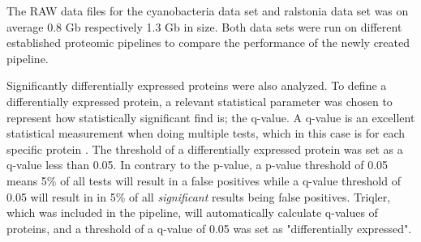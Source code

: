 The RAW data files for the cyanobacteria data set and ralstonia data set was on average 0.8 Gb respectively 1.3 Gb in size. Both data sets were run on different established proteomic pipelines to compare the performance of the newly created pipeline.

Significantly differentially expressed proteins were also analyzed. To define a differentially expressed protein, a relevant statistical parameter was chosen to represent how statistically significant find is; the q-value. A q-value is an excellent statistical measurement when doing multiple tests, which in this case is for each specific protein \cite{q-value}. The threshold of a differentially expressed protein was set as a q-value less than 0.05. In contrary to the p-value, a p-value threshold of 0.05 means 5\% of all tests will result in a false positives while a q-value threshold of 0.05 will result in in 5\% of all \textit{significant} results being false positives. Triqler, which was included in the pipeline, will automatically calculate q-values of proteins, and a threshold of a q-value of 0.05 was set as "differentially expressed".
